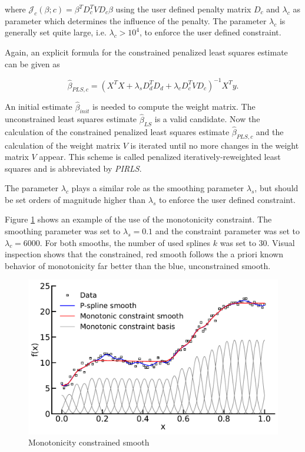 \documentclass[10pt,a4paper]{article}
\begin{document}
	where $\mathcal J_c(\beta; c) = \beta^T D_c^T V D_c \beta$ using the user defined penalty matrix $D_c$ and $\lambda_c$ as parameter which determines the influence of the penalty. The parameter $\lambda_c$ is generally set quite large, i.e. $\lambda_c > 10^4$, to enforce the user defined constraint. 
	
	Again, an explicit formula for the constrained penalized least squares estimate can be given as
	
	$$\hat \beta_{PLS,c} = (X^TX + \lambda_s D_d^T D_d  + \lambda_c D_c^T V D_c)^{-1} X^T y.$$
	
	An initial estimate $\hat \beta_{init}$ is needed to compute the weight matrix. The unconstrained least squares estimate $\hat \beta_{LS}$ is a valid candidate. Now the calculation of the constrained penalized least squares estimate $\hat \beta_{PLS, c}$ and the calculation of the weight matrix $V$ is iterated until no more changes in the weight matrix $V$ appear. This scheme is called penalized iteratively-reweighted least squares and is abbreviated by \emph{PIRLS}. \cite{hofner2011monotonicity}
	
	The parameter $\lambda_c$ plays a similar role as the smoothing parameter $\lambda_s$, but should be set orders of magnitude higher than $\lambda_s$ to enforce the user defined constraint. 
	
	Figure \ref{fig:incspline} shows an example of the use of the monotonicity constraint. The smoothing parameter was set to $\lambda_s = 0.1$ and the constraint parameter was set to $\lambda_c = 6000$. For both smooths, the number of used splines $k$ was set to $30$. Visual inspection shows that the constrained, red smooth follows the a priori known behavior of monotonicity far better than the blue, unconstrained smooth.
	
	
	\begin{figure}[H]
	\centering
	\includegraphics[width=\linewidth]{thesisplots/inc_spline.pdf}
	\caption{Monotonicity constrained smooth}
	\label{fig:incspline}
	\end{figure}		
\end{document}
